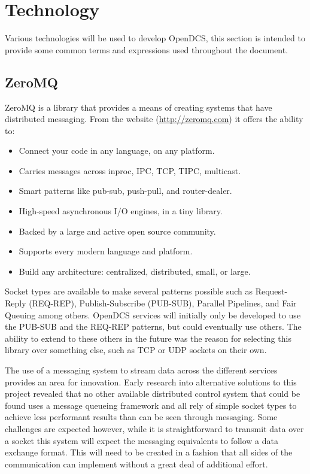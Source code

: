 \section{Technology}\label{sec:tech}

  Various technologies will be used to develop OpenDCS, this section is intended
  to provide some common terms and expressions used throughout the document.

  \subsection{ZeroMQ}\label{sec:tech-zmq}

    ZeroMQ is a library that provides a means of creating systems that have
    distributed messaging. From the website (\url{http://zeromq.com}) it offers
    the ability to:

    \begin{itemize}
      \item Connect your code in any language, on any platform.
      \item Carries messages across inproc, IPC, TCP, TIPC, multicast.
      \item Smart patterns like pub-sub, push-pull, and router-dealer.
      \item High-speed asynchronous I/O engines, in a tiny library.
      \item Backed by a large and active open source community.
      \item Supports every modern language and platform.
      \item Build any architecture: centralized, distributed, small, or large.
    \end{itemize}

    Socket types are available to make several patterns possible such as
    Request-Reply (REQ-REP), Publish-Subscribe (PUB-SUB), Parallel Pipelines,
    and Fair Queuing among others. OpenDCS services will initially only be
    developed to use the PUB-SUB and the REQ-REP patterns, but could eventually
    use others. The ability to extend to these others in the future was the
    reason for selecting this library over something else, such as TCP or UDP
    sockets on their own.

    The use of a messaging system to stream data across the different services
    provides an area for innovation. Early research into alternative solutions
    to this project revealed that no other available distributed control system
    that could be found uses a message queueing framework and all rely of
    simple socket types to achieve less performant results than can be seen
    through messaging. Some challenges are expected however, while it is
    straightforward to transmit data over a socket this system will expect the
    messaging equivalents to follow a data exchange format. This will need to
    be created in a fashion that all sides of the communication can implement
    without a great deal of additional effort.

